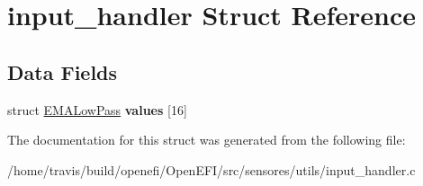 \hypertarget{structinput__handler}{}\section{input\+\_\+handler Struct Reference}
\label{structinput__handler}
\subsection*{Data Fields}
\begin{DoxyCompactItemize}
\item 
\mbox{\label{structinput__handler_a76a0e5349d8566a86ac7efa33c36c076}} 
struct \hyperlink{structEMALowPass}{E\+M\+A\+Low\+Pass} {\bfseries values} \mbox{[}16\mbox{]}
\end{DoxyCompactItemize}


The documentation for this struct was generated from the following file\+:\begin{DoxyCompactItemize}
\item 
/home/travis/build/openefi/\+Open\+E\+F\+I/src/sensores/utils/input\+\_\+handler.\+c\end{DoxyCompactItemize}
